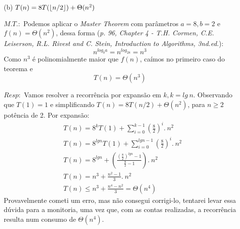 \documentclass{homework}
\DeclarePairedDelimiter\floor{\lfloor}{\rfloor}
\begin{document}
\pagestyle{fancy}

	\begin{enumerate}
		\item[(b)] $T(n) = 8T(\floor{n/2})+\Theta(n^2)$
		\item[$M. T.:$] Podemos aplicar o \textit{Master Theorem} com parâmetros $a = 8, b = 2$ e $f(n) = \Theta(n^2)$, dessa forma (\textit{p. 96, Chapter 4 - T.H. Cormen, C.E. Leiserson, R.L. Rivest and C. Stein, Introduction to Algorithms, 3nd.ed.}):
		\[n^{log_ba} = n^{log_28} = n^3\]
		Como $n^3$ é polinomialmente maior que $f(n)$, caímos no primeiro caso do teorema e
		\[T(n) = \Theta(n^3)\]
		\item[$Resp:$] Vamos resolver a recorrência por expansão em $k, k = lg\ n$. Observando que $T(1) = 1$ e simplificando $T(n) = 8T(n/2)+\Theta(n^2)$, para $n \geq 2$ potência de 2. Por expansão:
				\begin{align*}
					& T(n) = 8^kT\left(1\right) + \sum_{i=0}^{k-1} \left(\frac{8}{2}\right)^i.\ n^2\\
					& T(n) = 8^{lgn}T\left(1\right) + \sum_{i=0}^{lgn-1} \left(\frac{8}{2}\right)^i.\ n^2\\	
					& T(n) = 8^{lgn} + \left( \frac{\left( \frac{8}{2} \right)^{lgn} - 1}{\frac{8}{2} - 1} \right).\ n^2\\
					& T(n) = n^3 + \frac{n^2-1}{3} .\ n^2\\
					& T(n) \leq n^3 + \frac{n^4 - n^2}{3} = \Theta(n^4)
				\end{align*}
		Provavelmente cometi um erro, mas não consegui corrigi-lo, tentarei levar essa dúvida para a monitoria, uma vez que, com as contas realizadas, a recorrência resulta num consumo de $\Theta(n^4)$.
	\end{enumerate}	
	
\pagebreak	
		
\end{document}
